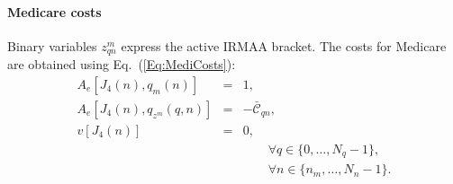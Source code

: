 \documentclass[fleqn,12pt]{report}
\begin{document}
\paragraph*{Medicare costs}
Binary variables $z_{qn}^m$ express the active IRMAA bracket.
The costs for Medicare are obtained using Eq.~(\ref{Eq:MediCosts}):
\begin{eqnarray}
	A_e[J_4(n), q_{m}(n)] &=& 1, \nonumber \\
	A_e[J_4(n), q_{z^m}(q, n)] &=& -\bar{\mathcal{C}}_{qn}, \nonumber \\
	v[J_4(n)] &=& 0, \nonumber \\
	&&\qquad\forall q \in \{0,\ldots, N_q - 1\}, \nonumber\\
	&&\qquad\forall n \in \{n_m,\ldots, N_n - 1\}.\nonumber
\end{eqnarray}
\end{document}
